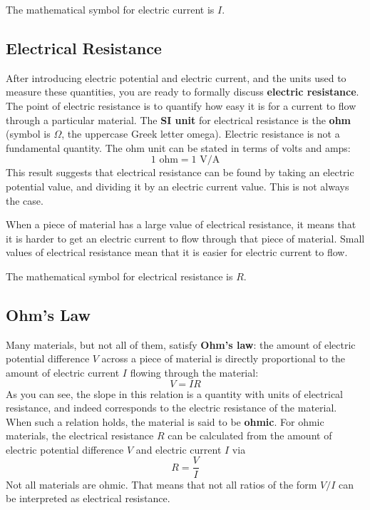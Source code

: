 The mathematical symbol for electric current is $I$.
\subsection{Electrical Resistance}
After introducing electric potential and electric current, and the units used to measure these quantities, you are ready to formally discuss \textbf{electric resistance}. The point of electric resistance is to quantify how easy it is for a current to flow through a particular material. The \textbf{SI unit} for electrical resistance is the \textbf{ohm} (symbol is $\Omega$, the uppercase Greek letter omega). Electric resistance is not a fundamental quantity. The ohm unit can be stated in terms of volts and amps:
\begin{equation}
	1 \text{ ohm} = 1 \text{ V/A}
\end{equation}
This result suggests that electrical resistance can be found by taking an electric potential value, and dividing it by an electric current value. This is not always the case.

When a piece of material has a large value of electrical resistance, it means that it is harder to get an electric current to flow through that piece of material. Small values of electrical resistance mean that it is easier for electric current to flow.

The mathematical symbol for electrical resistance is $R$.
\subsection{Ohm's Law}
Many materials, but not all of them, satisfy \textbf{Ohm's law}: the amount of electric potential difference $V$ across a piece of material is directly proportional to the amount of electric current $I$ flowing through the material:
\begin{equation}
	V = IR
\end{equation}
As you can see, the slope in this relation is a quantity with units of electrical resistance, and indeed corresponds to the electric resistance of the material. When such a relation holds, the material is said to be \textbf{ohmic}. For ohmic materials, the electrical resistance $R$ can be calculated from the amount of electric potential difference $V$ and electric current $I$ via
\begin{equation}
	R = \frac{V}{I}
	\label{eq.02.ohms.law}
\end{equation}
Not all materials are ohmic. That means that not all ratios of the form $V/I$ can be interpreted as electrical resistance.
